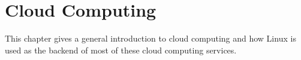 \chapter{Cloud Computing}

This chapter gives a general introduction to cloud computing and how Linux is used as the backend of most of these cloud computing services. 